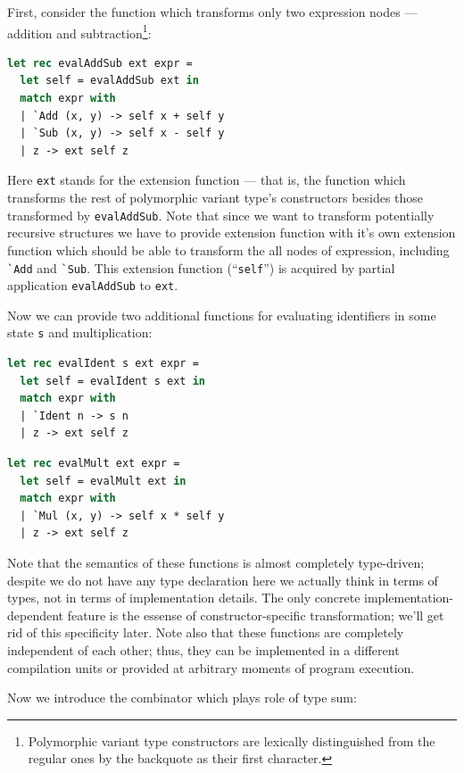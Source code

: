 First, consider the function which transforms only two expression nodes ---
addition and subtraction\footnote{Polymorphic variant type constructors are lexically distinguished
from the regular ones by the backquote as their first character.}:

\begin{lstlisting}[language=ocaml]
let rec evalAddSub ext expr =
  let self = evalAddSub ext in
  match expr with
  | `Add (x, y) -> self x + self y
  | `Sub (x, y) -> self x - self y
  | z -> ext self z
\end{lstlisting}

Here \lstinline{ext} stands for the extension function --- that is, the function which
transforms the rest of polymorphic variant type's constructors besides those transformed 
by \lstinline{evalAddSub}. Note that since we want to transform potentially recursive 
structures we have to provide extension function with it's own extension function which 
should be able to transform the all nodes of expression, including \lstinline{`Add} and
\lstinline{`Sub}. This extension function (``\lstinline{self}'') is acquired by partial
application \lstinline{evalAddSub} to \lstinline{ext}.

Now we can provide two additional functions for evaluating identifiers in some state 
\lstinline{s} and multiplication:

\begin{lstlisting}[language=ocaml]
let rec evalIdent s ext expr =
  let self = evalIdent s ext in
  match expr with
  | `Ident n -> s n
  | z -> ext self z
\end{lstlisting}

\begin{lstlisting}[language=ocaml]
let rec evalMult ext expr =
  let self = evalMult ext in
  match expr with
  | `Mul (x, y) -> self x * self y
  | z -> ext self z
\end{lstlisting}

Note that the semantics of these functions is almost completely type-driven; despite
we do not have any type declaration here we actually think in terms of types, not
in terms of implementation details. The only concrete implementation-dependent feature
is the essense of constructor-specific transformation; we'll get rid of this specificity 
later. Note also that these functions are completely independent of each other; thus, they 
can be implemented in a different compilation units or provided at arbitrary moments of 
program execution.

Now we introduce the combinator which plays role of type sum:

